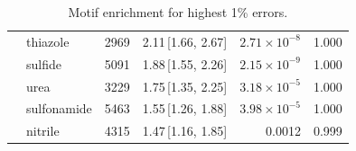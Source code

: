 \begin{table}[t]
\begin{tabular}{llrrrr}
      & thiazole & 2969 & 2.11\,[1.66, 2.67] & $2.71\times 10^{-8}$ & 1.000 \\
      & sulfide & 5091 & 1.88\,[1.55, 2.26] & $2.15\times 10^{-9}$ & 1.000 \\
      & urea & 3229 & 1.75\,[1.35, 2.25] & $3.18\times 10^{-5}$ & 1.000 \\
      & sulfonamide & 5463 & 1.55\,[1.26, 1.88] & $3.98\times 10^{-5}$ & 1.000 \\
      & nitrile & 4315 & 1.47\,[1.16, 1.85] & 0.0012 & 0.999 \\
    \hline
  \end{tabular}
  \caption{Motif enrichment for highest 1\% errors.}
  \label{tab:split_bonds_worst}
\end{table}
